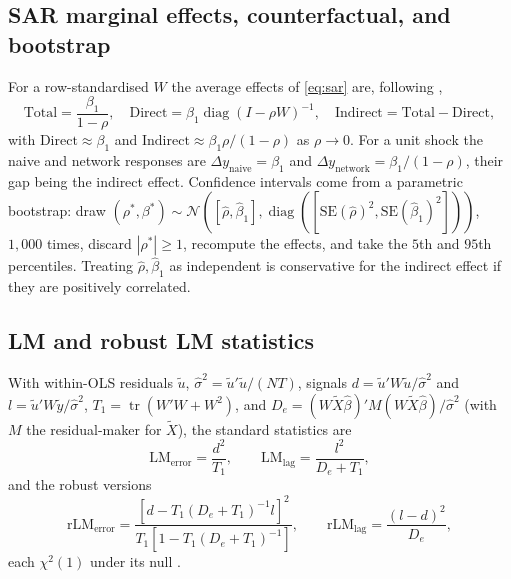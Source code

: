 \subsection{SAR marginal effects, counterfactual, and bootstrap}
\label{app:sarmult}
For a row-standardised $W$ the average effects of \eqref{eq:sar} are, following \cite{lesage2009},
\begin{equation}
  \text{Total}=\frac{\beta_1}{1-\rho},\quad
  \text{Direct}=\beta_1\operatorname{diag}(I-\rho W)^{-1},\quad
  \text{Indirect}=\text{Total}-\text{Direct},
  \label{eq:sareffects}
\end{equation}
with $\text{Direct}\approx\beta_1$ and
$\text{Indirect}\approx\beta_1\rho/(1-\rho)$ as $\rho\to 0$. For a unit shock the
naive and network responses are $\Delta y_{\text{naive}}=\beta_1$ and
$\Delta y_{\text{network}}=\beta_1/(1-\rho)$, their gap being the indirect effect.
Confidence intervals come from a parametric bootstrap: draw
$(\rho^*,\beta^*)\sim\mathcal N([\hat\rho,\hat\beta_1],\operatorname{diag}([\mathrm{SE}(\hat\rho)^2,\mathrm{SE}(\hat\beta_1)^2]))$,
$1{,}000$ times, discard $|\rho^*|\geq 1$, recompute the effects, and take
the $5$th and $95$th percentiles. Treating $\hat\rho,\hat\beta_1$ as independent is
conservative for the indirect effect if they are positively correlated.

\subsection{LM and robust LM statistics}
\label{app:lm}
With within-OLS residuals $\tilde u$, $\hat\sigma^2=\tilde u'\tilde u/(NT)$,
signals $d=\tilde u'W\tilde u/\hat\sigma^2$ and $l=\tilde u'W\tilde y/\hat\sigma^2$,
$T_1=\operatorname{tr}(W'W+W^2)$, and
$D_e=(W\tilde X\hat\beta)'M(W\tilde X\hat\beta)/\hat\sigma^2$ (with $M$ the
residual-maker for $\tilde X$), the standard statistics are
\begin{equation}
  \mathrm{LM}_{\text{error}}=\frac{d^2}{T_1},\qquad
  \mathrm{LM}_{\text{lag}}=\frac{l^2}{D_e+T_1},
\end{equation}
and the robust versions
\begin{equation}
  \mathrm{rLM}_{\text{error}}=\frac{[d-T_1(D_e+T_1)^{-1}l]^2}{T_1[1-T_1(D_e+T_1)^{-1}]},
  \qquad
  \mathrm{rLM}_{\text{lag}}=\frac{(l-d)^2}{D_e},
\end{equation}
each $\chi^2(1)$ under its null \citep{burridge1980, anselin1988, anselin1996}.

